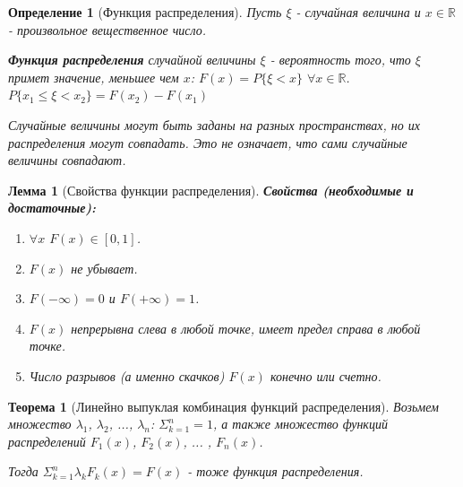 \documentclass[14pt]{extarticle}
\theoremstyle{breakstyle}
\newtheorem{definition}{Определение}[subsection]
\newtheorem{theorem}{Теорема}[subsection]
\newtheorem{lemma}{Лемма}[subsection]
\begin{document}
\begin{definition}[Функция распределения]
Пусть $\xi$ - случайная величина и $x \in \mathbb{R}$ - произвольное вещественное число.

\vspace{\baselineskip}

\textbf{Функция распределения} случайной величины $\xi$ - вероятность того, что $\xi$ примет значение, меньшее чем $x$: $F(x) = P\{\xi < x\}$ $\forall x \in \mathbb{R}$.\\
$P\{x_{1} \leq \xi < x_{2}\} = F(x_{2}) - F(x_{1})$

\vspace{\baselineskip}

Случайные величины могут быть заданы на разных пространствах, но их распределения могут совпадать. Это не означает, что сами случайные величины совпадают.

\end{definition}

\begin{lemma}[Свойства функции распределения]

\textbf{Свойства (необходимые и достаточные):}

\begin{enumerate}
    \item $\forall x$ $F(x) \in [0, 1]$.
    \item $F(x)$ не убывает.
    \item $F(-\infty) = 0$ и $F(+\infty) = 1$.
    \item $F(x)$ непрерывна слева в любой точке, имеет предел справа в любой точке. 
    \item Число разрывов (а именно скачков) $F(x)$ конечно или счетно.
\end{enumerate}

\end{lemma}

\begin{theorem}[Линейно выпуклая комбинация функций распределения]

Возьмем множество $\lambda_{1}$, $\lambda_{2}$, ..., $\lambda_{n}$: $\Sigma_{k=1}^{n} = 1$, а также множество функций распределений $F_{1}(x)$, $F_{2}(x)$, ... , $F_{n}(x)$.

\vspace{\baselineskip}

Тогда $\Sigma_{k=1}^{n}\lambda_{k}F_{k}(x) = F(x)$ - тоже функция распределения.

\end{theorem}
\end{document}

